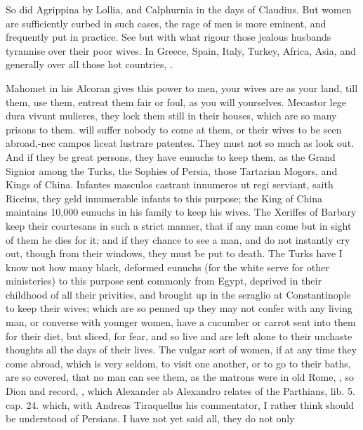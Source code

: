 So did Agrippina by Lollia, and Calphurnia in the days of Claudius. But
women are sufficiently curbed in such cases, the rage of men is more
eminent, and frequently put in practice. See but with what rigour those
jealous husbands tyrannise over their poor wives. In Greece, Spain,
Italy, Turkey, Africa, Asia, and generally over all those hot
countries, .

Mahomet in his Alcoran gives this power to men, your wives are as your
land, till them, use them, entreat them fair or foul, as you will
yourselves. Mecastor lege dura vivunt mulieres, they lock them
still in their houses, which are so many prisons to them. will suffer
nobody to come at them, or their wives to be seen abroad,-nec campos
liceat lustrare patentes. They must not so much as look out. And if
they be great persons, they have eunuchs to keep them, as the Grand
Signior among the Turks, the Sophies of Persia, those Tartarian Mogors,
and Kings of China. Infantes masculos castrant innumeros ut regi
serviant, saith Riccius, they geld innumerable infants to this
purpose; the King of China maintains 10,000 eunuchs in his family
to keep his wives. The Xeriffes of Barbary keep their courtesans in
such a strict manner, that if any man come but in sight of them he dies
for it; and if they chance to see a man, and do not instantly cry out,
though from their windows, they must be put to death. The Turks have I
know not how many black, deformed eunuchs (for the white serve for
other ministeries) to this purpose sent commonly from Egypt, deprived
in their childhood of all their privities, and brought up in the
seraglio at Constantinople to keep their wives; which are so penned up
they may not confer with any living man, or converse with younger
women, have a cucumber or carrot sent into them for their diet, but
sliced, for fear, \etc{} and so live and are left alone to their unchaste
thoughts all the days of their lives. The vulgar sort of women, if at
any time they come abroad, which is very seldom, to visit one another,
or to go to their baths, are so covered, that no man can see them, as
the matrons were in old Rome, , so
Dion and \Seneca record, , which
Alexander ab Alexandro relates of the Parthians, lib. 5. cap. 24.
which, with Andreas Tiraquellus his commentator, I rather think should
be understood of Persians. I have not yet said all, they do not only
